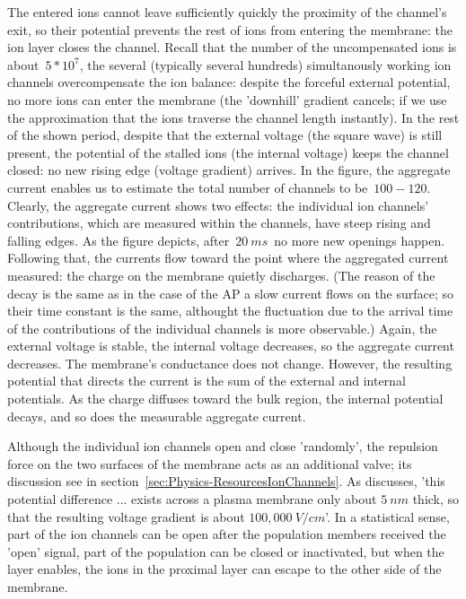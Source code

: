 The entered ions cannot leave sufficiently quickly 
the proximity of the channel's exit, so their potential prevents
the rest of ions from entering the membrane: the ion layer closes the channel.
Recall that the 
number of the uncompensated ions is about~$5*10^7$, the several
(typically several hundreds) simultanously working ion channels overcompensate the ion balance:
despite the forceful external potential, no more ions can enter
the membrane (the 'downhill' gradient cancels; if we use the approximation that the ions traverse the channel length instantly).
In the rest of the shown period, despite that the external voltage
(the square wave) is still present, the potential of the stalled ions
(the internal voltage) keeps the channel closed: no new rising edge (voltage gradient) arrives.
In the figure, the aggregate current enables us to estimate the 
total number of channels to be~$100-120$. 
Clearly, the aggregate current shows two effects: the individual ion channels' contributions, which are measured within the channels, have steep rising and falling edges. As the figure depicts, after~$20\ ms$~no more new openings happen.
Following that, the currents flow toward the point where
the aggregated current measured:
the charge on the membrane quietly discharges. 
(The reason of the decay is the same as in the case of
the \gls{AP}
a slow current flows on the surface; so their time constant is the same, althought the fluctuation due to the arrival time of the contributions
of the individual channels is more observable.)    Again, the external voltage
is stable, the internal voltage decreases, so the aggregate current decreases. The membrane's conductance does not change. However,
the resulting potential that directs the current is the sum of
the external and internal potentials. As the charge diffuses toward
the bulk region, the internal potential decays, and so does the measurable
aggregate current. 


Although the individual
ion channels open and close 'randomly', the repulsion force
on the two surfaces of the membrane acts as an additional valve; its discussion see in section~\ref{sec:Physics-ResourcesIonChannels}.
As \cite{MolecularBiology:2002} discusses,
'this potential difference ... exists across a plasma membrane only about $5\ nm$ thick,
so that the resulting voltage gradient is about $100,000\ V/cm$'.
In a statistical sense, part of the ion channels can be open
after the population members received the 'open' signal, part of the population can be closed
or inactivated,
but when the layer enables, the ions in the proximal layer
can escape to the other side of the membrane.



